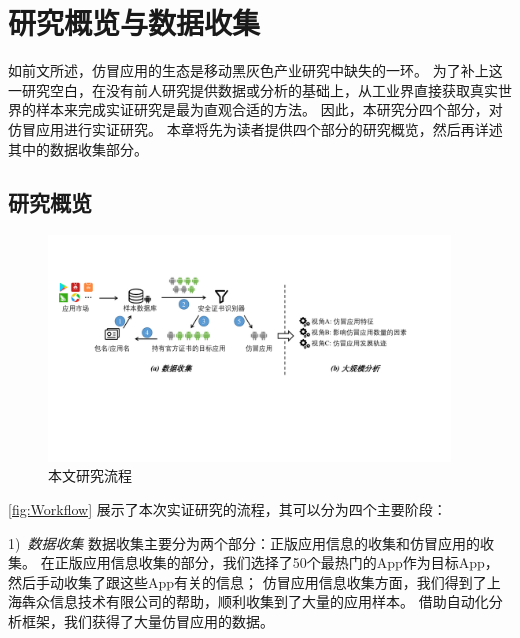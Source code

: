 \chapter{研究概览与数据收集}
\label{chp:dataCollection}

如前文所述，仿冒应用的生态是移动黑灰色产业研究中缺失的一环。
为了补上这一研究空白，在没有前人研究提供数据或分析的基础上，从工业界直接获取真实世界的样本来完成实证研究是最为直观合适的方法。
因此，本研究分四个部分，对仿冒应用进行实证研究。
本章将先为读者提供四个部分的研究概览，然后再详述其中的数据收集部分。

\section{研究概览}

\begin{figure}[htbp]
	\centering
	\includegraphics[width=0.95\textwidth]{./Figures/overview_modified.pdf}
	\caption{本文研究流程}
	\label{fig:Workflow}
	\vspace{-3mm}
\end{figure}

\autoref{fig:Workflow} 展示了本次实证研究的流程，其可以分为四个主要阶段：

1)\ \emph{数据收集} \quad
数据收集主要分为两个部分：正版应用信息的收集和仿冒应用的收集。
在正版应用信息收集的部分，我们选择了50个最热门的App作为目标App，然后手动收集了跟这些App有关的信息；
仿冒应用信息收集方面，我们得到了上海犇众信息技术有限公司的帮助，顺利收集到了大量的应用样本。
借助自动化分析框架\mytool，我们获得了大量仿冒应用的数据。

